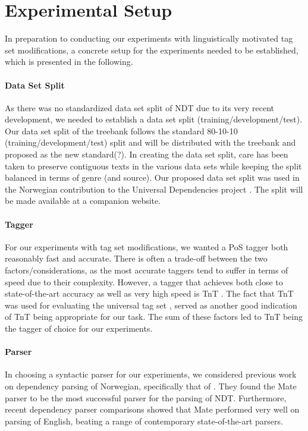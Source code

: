 \documentclass[11pt,a4paper]{article}
\begin{document}
\section{Experimental Setup}
\label{sec:setup}
In preparation to conducting our experiments with linguistically motivated tag
set modifications, a concrete setup for the experiments needed to be
established, which is presented in the following.

\paragraph{Data Set Split}
As there was no standardized data set split of NDT due to its very recent
development, we needed to establish a data set split
(training/development/test). Our data set split of the treebank follows the
standard 80-10-10 (training/development/test) split and will be distributed
with the treebank and proposed as the new standard(?). In creating the data set
split, care has been taken to preserve contiguous texts in the various data
sets while keeping the split balanced in terms of genre (and source). Our
proposed data set split was used in the Norwegian contribution to the Universal
Dependencies project \cite{Ovr:Hoh:16}.  The split will be made available at a
companion website.

\paragraph{Tagger}
For our experiments with tag set modifications, we wanted a PoS tagger both
reasonably fast and accurate. There is often a trade-off between the two
factors/considerations, as the most accurate taggers tend to suffer in terms of
speed due to their complexity. However, a tagger that achieves both close to
state-of-the-art accuracy as well as very high speed is TnT \cite{Bra:00}. The
fact that TnT was used for evaluating the universal tag set
\cite{Pet:Das:McD:12}, served as another good indication of TnT being
appropriate for our task. The sum of these factors led to TnT being the tagger
of choice for our experiments.

\paragraph{Parser}
In choosing a syntactic parser for our experiments, we considered previous work
on dependency parsing of Norwegian, specifically that of \cite{Sol:Skj:Ovr:14}.
They found the Mate parser \cite{Boh:10} to be the most successful parser for
the parsing of NDT. Furthermore, recent dependency parser comparisons
\cite{Cho:Tet:Ste:15} showed that Mate performed very well on parsing of
English, beating a range of contemporary state-of-the-art parsers.
\end{document}
